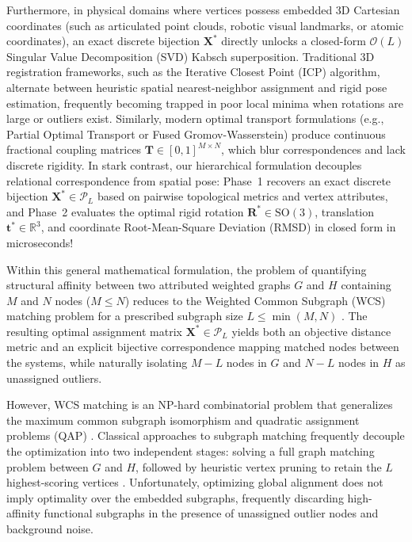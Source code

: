 \documentclass[conference]{IEEEtran}
\begin{document}
Furthermore, in physical domains where vertices possess embedded 3D Cartesian coordinates (such as articulated point clouds, robotic visual landmarks, or atomic coordinates), an exact discrete bijection $\mathbf{X}^*$ directly unlocks a closed-form $\mathcal{O}(L)$ Singular Value Decomposition (SVD) Kabsch superposition. Traditional 3D registration frameworks, such as the Iterative Closest Point (ICP) algorithm, alternate between heuristic spatial nearest-neighbor assignment and rigid pose estimation, frequently becoming trapped in poor local minima when rotations are large or outliers exist. Similarly, modern optimal transport formulations (e.g., Partial Optimal Transport or Fused Gromov-Wasserstein) produce continuous fractional coupling matrices $\mathbf{T} \in [0, 1]^{M \times N}$, which blur correspondences and lack discrete rigidity. In stark contrast, our hierarchical formulation decouples relational correspondence from spatial pose: Phase~1 recovers an exact discrete bijection $\mathbf{X}^* \in \mathcal{P}_L$ based on pairwise topological metrics and vertex attributes, and Phase~2 evaluates the optimal rigid rotation $\mathbf{R}^* \in \mathrm{SO}(3)$, translation $\mathbf{t}^* \in \mathbb{R}^3$, and coordinate Root-Mean-Square Deviation (RMSD) in closed form in microseconds!

Within this general mathematical formulation, the problem of quantifying structural affinity between two attributed weighted graphs $G$ and $H$ containing $M$ and $N$ nodes ($M \leq N$) reduces to the Weighted Common Subgraph (WCS) matching problem for a prescribed subgraph size $L \leq \min(M, N)$ \cite{yang2018algorithm}. The resulting optimal assignment matrix $\mathbf{X}^* \in \mathcal{P}_L$ yields both an objective distance metric and an explicit bijective correspondence mapping matched nodes between the systems, while naturally isolating $M - L$ nodes in $G$ and $N - L$ nodes in $H$ as unassigned outliers.

However, WCS matching is an NP-hard combinatorial problem that generalizes the maximum common subgraph isomorphism and quadratic assignment problems (QAP) \cite{garey1979, loiola2007}. Classical approaches to subgraph matching frequently decouple the optimization into two independent stages: solving a full graph matching problem between $G$ and $H$, followed by heuristic vertex pruning to retain the $L$ highest-scoring vertices \cite{zaslavskiy2009, gold1996}. Unfortunately, optimizing global alignment does not imply optimality over the embedded subgraphs, frequently discarding high-affinity functional subgraphs in the presence of unassigned outlier nodes and background noise.
\end{document}
